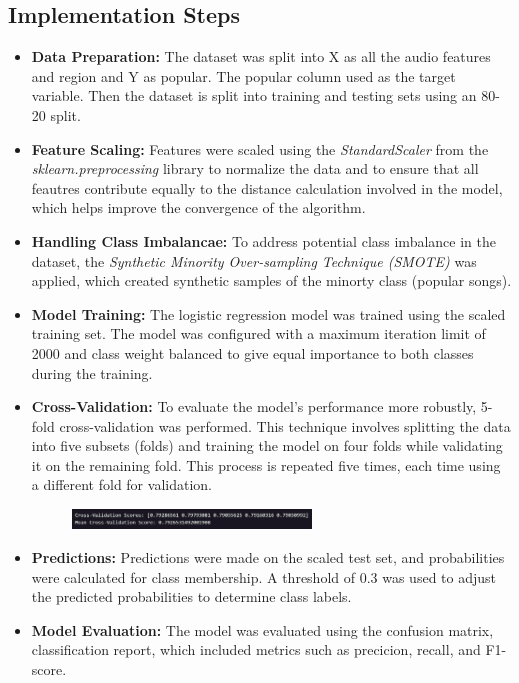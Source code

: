 \subsection{Implementation Steps}
\begin{itemize}
    \item \textbf{Data Preparation: } The dataset was split into X as all the audio features and region and Y as popular.
    The popular column used as the target variable. Then the dataset is split into training and testing sets using an 80-20 split.
    \item \textbf{Feature Scaling: } Features were scaled using the \textit{StandardScaler} from the \textit{sklearn.preprocessing} library to 
    normalize the data and to ensure that all feautres contribute equally to the distance calculation involved in the model, which helps improve the convergence of the algorithm.
    \item \textbf{Handling Class Imbalancae: } To address potential class imbalance in the dataset, the \textit{Synthetic Minority Over-sampling Technique (SMOTE)} was applied, which
    created synthetic samples of the minorty class (popular songs).
    \item \textbf{Model Training: } The logistic regression model was trained using the scaled training set. The model was
    configured with a maximum iteration limit of 2000 and class weight balanced to give equal importance to both classes during the training.
    \item \textbf{Cross-Validation: } To evaluate the model's performance more robustly, 5-fold cross-validation was performed.
    This technique involves splitting the data into five subsets (folds) and training the model on four folds while validating it on the remaining
    fold. This process is repeated five times, each time using a different fold for validation.
        \begin{figure}[h] 
            \centering 
            \includegraphics[width=0.6\textwidth]{media/logistic_reg_cross_val_results.png} 
        \end{figure}
    \item \textbf{Predictions: } Predictions were made on the scaled test set, and probabilities were calculated for class membership. A threshold of 0.3 was used to adjust the predicted probabilities to determine class labels.
    \item \textbf{Model Evaluation: } The model was evaluated using the confusion matrix, classification report, which included metrics such as precicion, recall, and F1-score.

\end{itemize}
